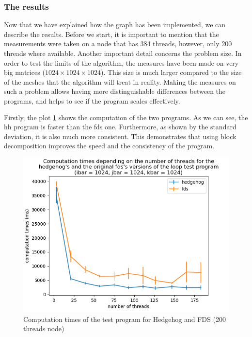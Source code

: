 \subsubsection{The results}

Now that we have explained how the graph has been implemented, we can describe
the results. Before we start, it is important to mention that the measurements
were taken on a node that has 384 threads, however, only 200 threads where
available. Another important detail concerns the problem size. In order to test
the limits of the algorithm, the measures have been made on very big matrices
($1024\times1024\times1024$). This size is much larger compared to the size of
the meshes that the algorithm will treat in reality. Making the measures on such
a problem allows having more distinguishable differences between the programs,
and helps to see if the program scales effectively.

Firstly, the plot \ref{fig:loopscomptime} shows the computation of the two
programs. As we can see, the \gls{hh} program is faster than the \gls{fds} one.
Furthermore, as shown by the standard deviation, it is also much more
consistent. This demonstrates that using block decomposition improves the speed
and the consistency of the program. \clearpage{}

\begin{figure}[ht!]
  \begin{center}
    \includegraphics[scale=0.6]{img/fds-loops/times.png}
    \caption{Computation times of the test program for Hedgehog and FDS (200 threads node)}
    \label{fig:loopscomptime}
  \end{center}
\end{figure}


